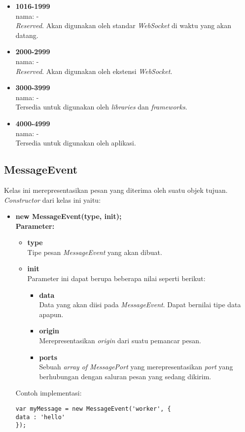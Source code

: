 \begin{itemize}
	\item \textbf{1016-1999} \\ nama: - \\ \textit{Reserved}. Akan digunakan oleh standar \textit{WebSocket} di waktu yang akan datang.
	
	\item \textbf{2000-2999} \\ nama: - \\ \textit{Reserved}. Akan digunakan oleh ekstensi \textit{WebSocket}.
	
	\item \textbf{3000-3999} \\ nama: - \\ Tersedia untuk digunakan oleh \textit{libraries} dan \textit{frameworks}.
	
	\item \textbf{4000-4999} \\ nama: - \\ Tersedia untuk digunakan oleh aplikasi.
\end{itemize}

\subsection{MessageEvent}
Kelas ini merepresentasikan pesan yang diterima oleh suatu objek tujuan. \textit{Constructor} dari kelas ini yaitu: 
\begin{itemize}
	\item \textbf{new MessageEvent(type, init);} \\
	\textbf{Parameter:}
	\begin{itemize}
		\item \textbf{type} \\ Tipe pesan \textit{MessageEvent} yang akan dibuat.
		\item \textbf{init} \\ Parameter ini dapat berupa beberapa nilai seperti berikut:
		\begin{itemize}
			\item \textbf{data} \\ Data yang akan diisi pada \textit{MessageEvent}. Dapat bernilai tipe data apapun.
			\item \textbf{origin} \\ Merepresentasikan \textit{origin} dari suatu pemancar pesan.
			\item \textbf{ports} \\ Sebuah \textit{array of MessagePort} yang merepresentasikan \textit{port} yang berhubungan dengan saluran pesan yang sedang dikirim.
		\end{itemize}
	\end{itemize}
	Contoh implementasi:
\begin{lstlisting}
var myMessage = new MessageEvent('worker', {
data : 'hello'
});
\end{lstlisting}
\end{itemize}

